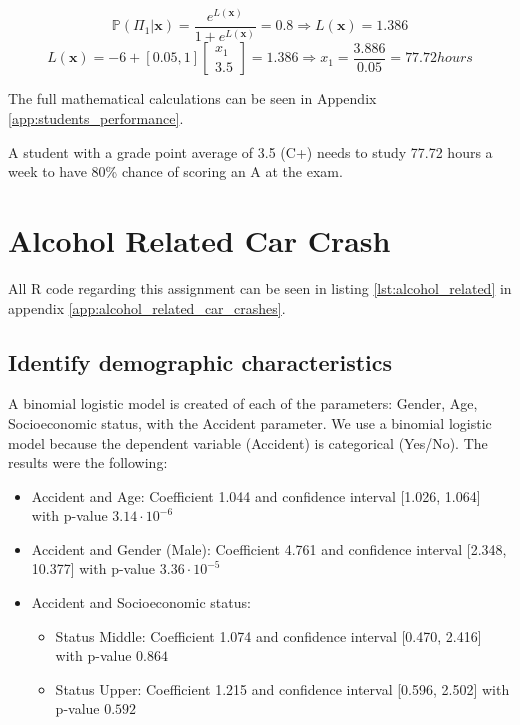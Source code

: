 \begin{equation}\label{eq:P}
\mathbb{P}(\Pi_1 | \textbf{x}) = \frac{e^{L(\textbf{x})}}{1+e^{L(\textbf{x})}} = 0.8 \Rightarrow L(\textbf{x}) = 1.386
\end{equation}
\begin{equation}\label{eq:L}
    L(\textbf{x}) = -6+[0.05,1]\begin{bmatrix}x_1 \\ 3.5\end{bmatrix}=1.386 \Rightarrow x_1=\frac{3.886}{0.05}=77.72 hours
\end{equation}

The full mathematical calculations can be seen in Appendix \ref{app:students_performance}.

A student with a grade point average of 3.5 (C+) needs to study 77.72 hours a week to have 80\% chance of scoring an A at the exam.


\section{Alcohol Related Car Crash}
All R code regarding this assignment can be seen in listing \ref{lst:alcohol_related} in appendix \ref{app:alcohol_related_car_crashes}.

\subsection{Identify demographic characteristics}

A binomial logistic model is created of each of the parameters: Gender, Age, Socioeconomic status, with the Accident parameter. We use a binomial logistic model because the dependent variable (Accident) is categorical (Yes/No).
The results were the following:

\begin{itemize}
    \item Accident and Age: Coefficient 1.044 and confidence interval [1.026, 1.064] with p-value $3.14 \cdot 10^{-6}$
    \item Accident and Gender (Male): Coefficient 4.761 and confidence interval [2.348, 10.377] with p-value $3.36 \cdot 10^{-5}$
    \item Accident and Socioeconomic status: 
    \begin{itemize}
        \item Status Middle: Coefficient 1.074 and confidence interval [0.470, 2.416] with p-value $0.864$
        \item Status Upper: Coefficient 1.215 and confidence interval [0.596, 2.502] with p-value $0.592$
    \end{itemize}
\end{itemize}

